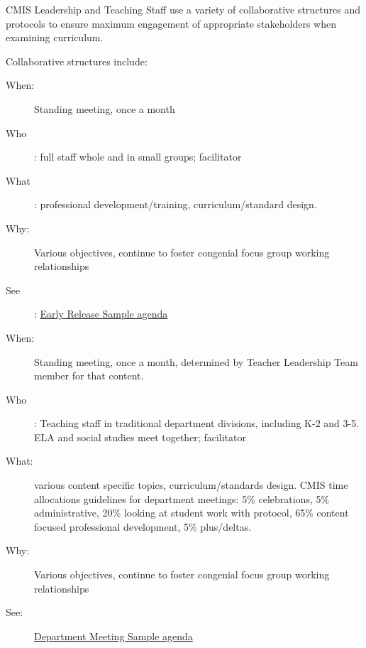 \begin{findings}

CMIS Leadership and Teaching Staff use a variety of collaborative structures and protocols to ensure maximum engagement of appropriate stakeholders when examining curriculum. 

Collaborative structures include: 


\begin{description}
\item [When:] Standing meeting, once a month 
\item [Who]: full staff whole and in small groups; facilitator 
\item [What]: professional development/training, curriculum/standard design. 
\item [Why:] Various objectives, continue to foster congenial focus group working relationships
\item [See]: \href{https://docs.google.com/a/cmis.ac.th/document/d/1RoLU6YF794M-w835lARCN-PAiZ18xGDlbtLd93Qvkqc/edit?usp=sharing}{Early Release Sample agenda}
\end{description}



\begin{description}
\item [When:] Standing meeting, once a month, determined by Teacher Leadership Team member for that content. 
\item [Who]: Teaching staff in traditional department divisions, including K-2 and 3-5. ELA and social studies meet together; facilitator 
\item [What:] various content specific topics, curriculum/standards design. CMIS time allocations guidelines for department meetings: 5\% celebrations, 5\% administrative, 20\% looking at student work with protocol, 65\% content focused professional development, 5\% plus/deltas. 
\item [Why:] Various objectives, continue to foster congenial focus group working relationships
\item [See:] \href{https://docs.google.com/a/cmis.ac.th/document/d/1umDrBbwhE8UFXVo4s6ytS6Ykxf4uJRs0MFSvgQewjys/edit?usp=sharing}{Department Meeting Sample agenda}
\end{description}



\end{findings}

